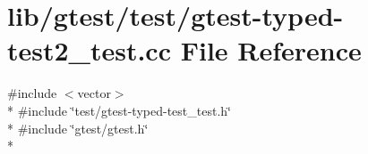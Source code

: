 \hypertarget{gtest-typed-test2__test_8cc}{\section{lib/gtest/test/gtest-\/typed-\/test2\-\_\-test.cc File Reference}
\label{gtest-typed-test2__test_8cc}
}
{\ttfamily \#include $<$vector$>$}\\*
{\ttfamily \#include \char`\"{}test/gtest-\/typed-\/test\-\_\-test.\-h\char`\"{}}\\*
{\ttfamily \#include \char`\"{}gtest/gtest.\-h\char`\"{}}\\*
